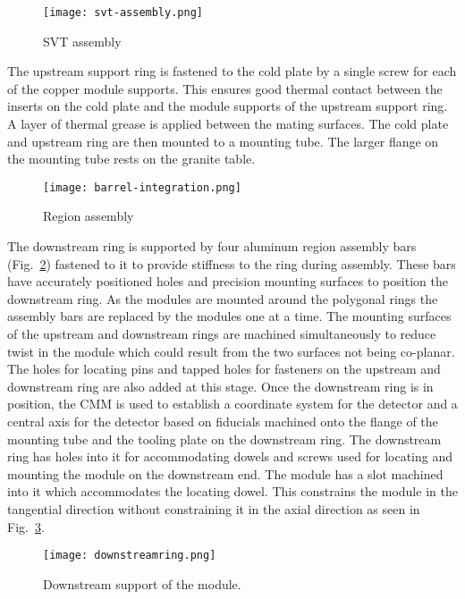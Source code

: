 \begin{figure}[hbt] 
\centering 
\texttt{[image: svt-assembly.png]}
\caption{SVT assembly}
\label{fig:svt-assembly}
\end{figure}

The upstream support ring is fastened to the cold plate by a single screw for each of the copper module supports. This ensures good thermal contact between the inserts on the cold plate and the module supports of the upstream support ring. A layer of thermal grease is applied between the mating surfaces. The cold plate and upstream ring are then mounted to a mounting tube. The larger flange on the mounting tube rests on the granite table. 

\begin{figure}[hbt] 
\centering 
\texttt{[image: barrel-integration.png]}
\caption{Region assembly}
\label{fig:barrel-integration}
\end{figure}

The downstream ring is supported by four aluminum region assembly bars (Fig.~\ref{fig:barrel-integration}) fastened to it to provide stiffness to the ring during assembly. These bars have accurately positioned holes and precision mounting surfaces to position the downstream ring. As the modules are mounted around the polygonal rings the assembly bars are replaced by the modules one at a time. The mounting surfaces of the upstream and downstream rings are machined simultaneously to reduce twist in the module which could result from the two surfaces not being co-planar. The holes for locating pins and tapped holes for fasteners on the upstream and downstream ring are also added at this stage. Once the downstream ring is in position, the CMM is used to establish a coordinate system for the detector and a central axis for the detector based on fiducials machined onto the flange of the mounting tube and the tooling plate on the downstream ring. The downstream ring has holes into it for accommodating dowels and screws used for locating and mounting the module on the downstream end. The module has a slot machined into it which accommodates the locating dowel. This constrains the module in the tangential direction without constraining it in the axial direction as seen in Fig.~\ref{fig:downstreamring}. 

\begin{figure}[hbt] 
\centering 
\texttt{[image: downstreamring.png]}
\caption{Downstream support of the module.}
\label{fig:downstreamring}
\end{figure}

